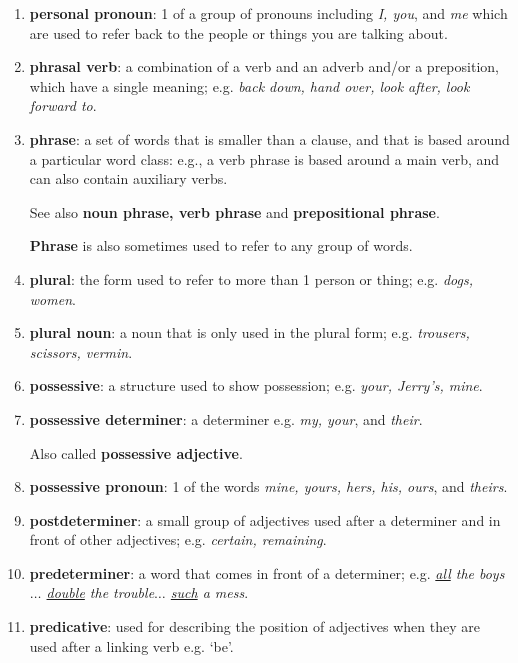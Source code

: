 \documentclass[oneside]{book}
\numberwithin{equation}{section}
\begin{document}
\begin{enumerate}
    They are the 1st person (the person speaking or writing), the 2nd person (the person being addressed), and the 3rd person (the person or things that are being talked about).
    \item \textbf{personal pronoun}: 1 of a group of pronouns including \textit{I, you}, and \textit{me} which are used to refer back to the people or things you are talking about.
    \item \textbf{phrasal verb}: a combination of a verb and an adverb and/or a preposition, which have a single meaning; e.g. \textit{back down, hand over, look after, look forward to}.
    \item \textbf{phrase}: a set of words that is smaller than a clause, and that is based around a particular word class: e.g., a verb phrase is based around a main verb, and can also contain auxiliary verbs.
    
    See also \textbf{noun phrase, verb phrase} and \textbf{prepositional phrase}.
    
    \textbf{Phrase} is also sometimes used to refer to any group of words.
    \item \textbf{plural}: the form used to refer to more than 1 person or thing; e.g. \textit{dogs, women}.
    \item \textbf{plural noun}: a noun that is only used in the plural form; e.g. \textit{trousers, scissors, vermin}.
    \item \textbf{possessive}: a structure used to show possession; e.g. \textit{your, Jerry's, mine}.
    \item \textbf{possessive determiner}: a determiner e.g. \textit{my, your}, and \textit{their}.
    
    Also called \textbf{possessive adjective}.
    \item \textbf{possessive pronoun}: 1 of the words \textit{mine, yours, hers, his, ours}, and \textit{theirs}.
    \item \textbf{postdeterminer}: a small group of adjectives used after a determiner and in front of other adjectives; e.g. \textit{certain, remaining}.
    \item \textbf{predeterminer}: a word that comes in front of a determiner; e.g. \textit{\underline{all} the boys$\ldots$ \underline{double} the trouble$\ldots$ \underline{such} a mess}.
    \item \textbf{predicative}: used for describing the position of adjectives when they are used after a linking verb e.g. `be'.
    

\end{enumerate}
\end{document}
